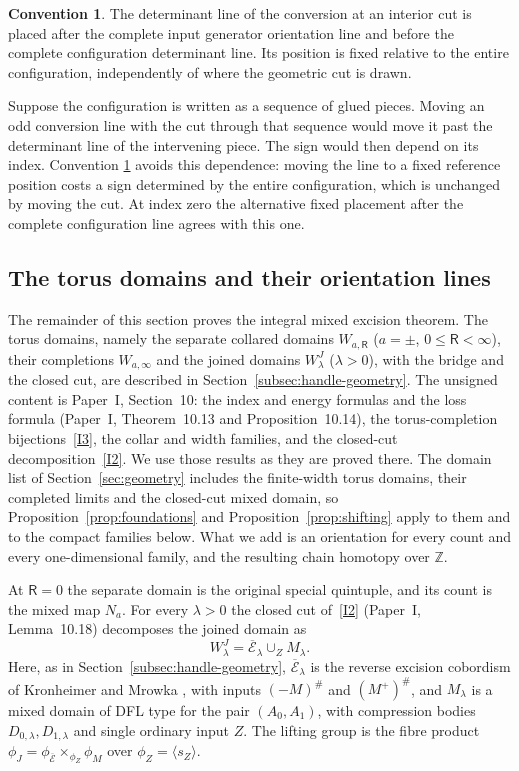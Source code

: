 \documentclass[11pt]{amsart}
\theoremstyle{definition}
\newtheorem{convention}[theorem]{Convention}
\theoremstyle{remark}
\theoremstyle{plain}
\numberwithin{equation}{section}
\newcommand{\ZZ}{\mathbb Z}
\begin{document}
\begin{convention}\label{conv:interior-line}
The determinant line of the conversion at an interior
cut is placed after the complete input generator orientation line
and before the complete configuration determinant line.
Its position is fixed relative to the entire
configuration, independently of where the geometric
cut is drawn.
\end{convention}

Suppose the configuration is written as a sequence of
glued pieces. Moving an odd conversion line with the
cut through that sequence would move it past the
determinant line of the intervening piece. The sign
would then depend on its index. Convention
\ref{conv:interior-line} avoids this dependence: moving
the line to a fixed reference position costs a sign
determined by the entire configuration, which is
unchanged by moving the cut. At index zero the
alternative fixed placement after the complete
configuration line agrees with this one.

\subsection{The torus domains and their orientation lines}
\label{subsec:torus-lines}
The remainder of this section proves the integral mixed excision
theorem. The torus domains, namely the separate collared domains
$W_{a,\mathsf R}$ ($a=\pm$, $0\le\mathsf R<\infty$), their completions
$W_{a,\infty}$ and the joined domains $W^J_\lambda$ ($\lambda>0$), with the
bridge and the closed cut, are described in
Section~\ref{subsec:handle-geometry}. The unsigned content is Paper~I,
Section~10: the index and energy formulas and the loss formula (Paper~I,
Theorem~10.13 and Proposition~10.14), the torus-completion
bijections~\ref{I3}, the collar and width families, and the closed-cut
decomposition~\ref{I2}. We use those results as they are proved there. The
domain list of Section~\ref{sec:geometry} includes the finite-width
torus domains, their completed limits and the closed-cut mixed
domain, so Proposition~\ref{prop:foundations} and
Proposition~\ref{prop:shifting} apply to them and to
the compact families below. What we add is an orientation for every
count and every one-dimensional family, and the resulting chain
homotopy over $\ZZ$.

At $\mathsf R=0$ the separate domain is the original special
quintuple, and its count is the mixed map $N_a$. For every
$\lambda>0$ the closed cut of~\ref{I2} (Paper~I, Lemma~10.18)
decomposes the
joined domain as
\[
 W^J_\lambda=\overline{\mathcal E}_\lambda\cup_Z M_\lambda .
\]
Here, as in Section~\ref{subsec:handle-geometry},
$\overline{\mathcal E}_\lambda$ is the reverse excision cobordism of
Kronheimer and Mrowka \cite[Section~5.3]{KM-unknot}, with inputs $(-M)^\#$ and $(M^+)^\#$, and
$M_\lambda$ is a mixed domain of DFL type for the pair $(A_0,A_1)$,
with compression bodies $D_{0,\lambda},D_{1,\lambda}$ and single
ordinary input $Z$. The lifting group is the fibre product
$\phi_J=\phi_{\overline{\mathcal E}}\times_{\phi_Z}\phi_M$ over
$\phi_Z=\langle s_Z\rangle$.
\end{document}
